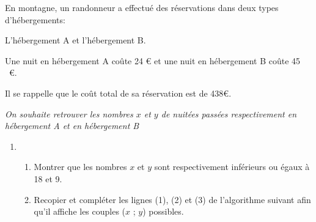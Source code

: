 \documentclass{cornouaille}
\begin{document}



\begin{exercice}
  En montagne, un randonneur a effectué des réservations dans deux types d'hébergements:

L'hébergement A et l'hébergement B.

Une nuit en hébergement A coûte 24 \euro{} et une nuit en  hébergement B coûte 45 ~\euro{}.

Il se rappelle que le coût  total de sa réservation est de 438\euro{}.
 
\emph{On souhaite retrouver les nombres $x$ et $y$ de nuitées passées respectivement en hébergement A et en  hébergement B}

\medskip
 
\begin{enumerate}
\item 
	\begin{enumerate}
		\item Montrer que les nombres $x$ et $y$ sont respectivement inférieurs ou égaux à 18 et 9.		
		\item Recopier et compléter les lignes (1), (2) et (3) de l'algorithme suivant afin qu'il affiche les couples ($x$ ; $y$) possibles.


\end{enumerate}
\end{enumerate}
\end{exercice}
\end{document}
